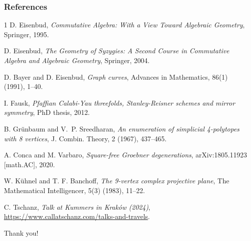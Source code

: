 \documentclass{beamer}
\begin{document}
\begin{frame}%
\frametitle{References}

{\scriptsize
\begin{thebibliography}{1}
D. Eisenbud,
\emph{Commutative Algebra: With a View Toward Algebraic Geometry},
Springer, 1995.

D. Eisenbud,
\emph{The Geometry of Syzygies: A Second Course in Commutative Algebra and 
Algebraic Geometry},
Springer, 2004.

D. Bayer and D. Eisenbud,
\emph{Graph curves},
Advances in Mathematics, 86(1) (1991), 1--40.

I. Fausk,
\emph{Pfaffian Calabi-Yau threefolds, Stanley-Reisner schemes and mirror symmetry},
PhD thesis, 2012.

B. Grünbaum and V.~P. Sreedharan,
\emph{An enumeration of simplicial 4-polytopes with 8 vertices},
J. Combin. Theory, 2 (1967), 437–465.

A. Conca and M. Varbaro,
\emph{Square-free Groebner degenerations},
arXiv:1805.11923 [math.AC], 2020.

W. K{\"u}hnel and T. F. Banchoff,
\emph{The 9-vertex complex projective plane},
The Mathematical Intelligencer, 5(3) (1983), 11--22.

C. Tschanz,
\emph{Talk at Kummers in Kraków (2024)},
\url{https://www.callatschanz.com/talks-and-travels}.
\end{thebibliography}
}

\end{frame}

\begin{frame}%
\centering
\LARGE Thank you!
\end{frame}



\end{document}
